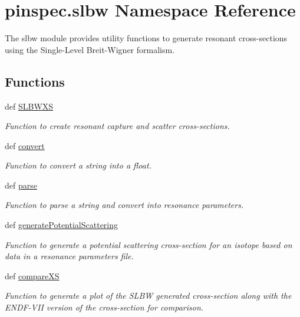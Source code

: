 \hypertarget{namespacepinspec_1_1slbw}{\section{pinspec.\-slbw Namespace Reference}
\label{namespacepinspec_1_1slbw}
}


The slbw module provides utility functions to generate resonant cross-\/sections using the Single-\/\-Level Breit-\/\-Wigner formalism.  


\subsection*{Functions}
\begin{DoxyCompactItemize}
\item 
def \hyperlink{namespacepinspec_1_1slbw_a4aafba8dacef99e07de3143d25345244}{S\-L\-B\-W\-X\-S}
\begin{DoxyCompactList}\small\item\em Function to create resonant capture and scatter cross-\/sections. \end{DoxyCompactList}\item 
def \hyperlink{namespacepinspec_1_1slbw_a026e643a6e213703f2b18533c7149c03}{convert}
\begin{DoxyCompactList}\small\item\em Function to convert a string into a float. \end{DoxyCompactList}\item 
def \hyperlink{namespacepinspec_1_1slbw_a76171c0756809c031a091b2b5bfda666}{parse}
\begin{DoxyCompactList}\small\item\em Function to parse a string and convert into resonance parameters. \end{DoxyCompactList}\item 
def \hyperlink{namespacepinspec_1_1slbw_a7ebd0410cdcdcfbdc9bb26d6d456cbdf}{generate\-Potential\-Scattering}
\begin{DoxyCompactList}\small\item\em Function to generate a potential scattering cross-\/section for an isotope based on data in a resonance parameters file. \end{DoxyCompactList}\item 
def \hyperlink{namespacepinspec_1_1slbw_a48b45b1d229e9afa999d8cb5fc201144}{compare\-X\-S}
\begin{DoxyCompactList}\small\item\em Function to generate a plot of the S\-L\-B\-W generated cross-\/section along with the E\-N\-D\-F-\/\-V\-I\-I version of the cross-\/section for comparison. \end{DoxyCompactList}\end{DoxyCompactItemize}


